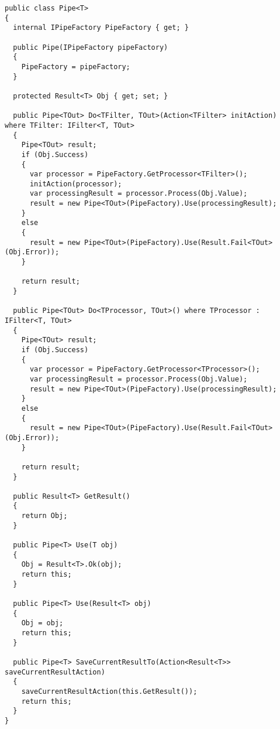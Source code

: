 \begin{lstlisting}[style=fsharpstyle,caption={Определение класса Pipe},label=lst:pipe]
public class Pipe<T>
{
  internal IPipeFactory PipeFactory { get; }

  public Pipe(IPipeFactory pipeFactory)
  {
    PipeFactory = pipeFactory;
  }

  protected Result<T> Obj { get; set; }

  public Pipe<TOut> Do<TFilter, TOut>(Action<TFilter> initAction) where TFilter: IFilter<T, TOut>
  {
    Pipe<TOut> result;
    if (Obj.Success)
    {
      var processor = PipeFactory.GetProcessor<TFilter>();
      initAction(processor);
      var processingResult = processor.Process(Obj.Value);
      result = new Pipe<TOut>(PipeFactory).Use(processingResult);
    }
    else
    {
      result = new Pipe<TOut>(PipeFactory).Use(Result.Fail<TOut>(Obj.Error));
    }

    return result;
  }

  public Pipe<TOut> Do<TProcessor, TOut>() where TProcessor : IFilter<T, TOut>
  {
    Pipe<TOut> result;
    if (Obj.Success)
    {
      var processor = PipeFactory.GetProcessor<TProcessor>();
      var processingResult = processor.Process(Obj.Value);
      result = new Pipe<TOut>(PipeFactory).Use(processingResult);
    }
    else
    {
      result = new Pipe<TOut>(PipeFactory).Use(Result.Fail<TOut>(Obj.Error));
    }

    return result;
  }

  public Result<T> GetResult()
  {
    return Obj;
  }

  public Pipe<T> Use(T obj)
  {
    Obj = Result<T>.Ok(obj);
    return this;
  }

  public Pipe<T> Use(Result<T> obj)
  {
    Obj = obj;
    return this;
  }

  public Pipe<T> SaveCurrentResultTo(Action<Result<T>> saveCurrentResultAction)
  {
    saveCurrentResultAction(this.GetResult());
    return this;
  }
}
\end{lstlisting}

